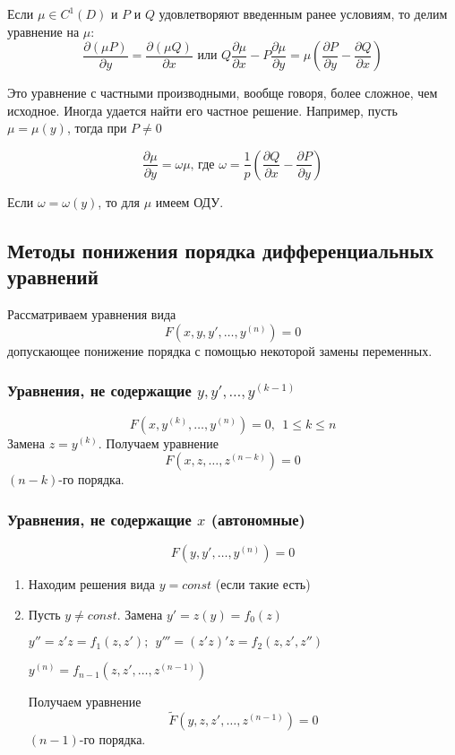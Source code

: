 \documentclass{article}
\newcommand{\pd}[2]{\frac{\partial {#1}}{\partial {#2}}}
\begin{document}
  Если $\mu \in C^1(D)$ и $P$ и $Q$ удовлетворяют введенным ранее условиям, то делим уравнение на $\mu$:
  \[ \pd{(\mu P)}{y} = \pd{(\mu Q)}{x} \text{ или } Q\pd{\mu}{x} - P\pd{\mu}{y} = \mu\left(\pd{P}{y} - \pd{Q}{x} \right) \]

  Это уравнение с частными производными, вообще говоря, более сложное, чем исходное. Иногда удается найти его частное решение. Например, пусть  $\mu = \mu(y)$, тогда при $P \neq 0$

  \[ \pd{\mu}{y} = \omega\mu \text{, где } \omega = \frac{1}{p} \left( \pd{Q}{x} - \pd{P}{y} \right)\]

  Если $\omega = \omega(y)$, то для $\mu$ имеем ОДУ.

  \subsection{Методы понижения порядка дифференциальных уравнений}
  Рассматриваем уравнения вида
  \begin{equation}
  \label{three.one}
  F(x, y, y', \ldots , y^{(n)}) = 0
  \end{equation}
  допускающее понижение порядка с помощью некоторой замены переменных.
  
  \subsubsection{Уравнения, не содержащие $y , y', \ldots, y^{(k-1)}$}
  \begin{equation}
  \label{three.two}
  F(x, y^{(k)}, \ldots, y^{(n)}) = 0,~~ 1 \leqslant k \leqslant n
  \end{equation}
  Замена $z = y^{(k)}$. Получаем уравнение
  \[ F(x, z, \ldots, z^{(n - k)}) = 0 \]
  $(n - k)$-го порядка.

  \subsubsection{Уравнения, не содержащие $x$ (автономные)}
  \begin{equation}
  \label{three.three}
  F(y, y', \ldots, y^{(n)}) = 0
  \end{equation}
  \begin{enumerate}
  \item Находим решения вида $y = const$ (если такие есть)
  \item Пусть $y \neq const$. Замена $y' = z(y) = f_0(z)$

  \noindent $y'' = z'z = f_1(z, z'); ~~ y''' = (z'z)'z = f_2(z, z', z'')$

  \noindent $y^{(n)} = f_{n - 1}(z, z', \ldots, z^{(n-1)})$

  Получаем уравнение
  $$ \tilde{F}(y, z, z', \ldots, z^{(n -1)}) = 0 $$
  $(n - 1)$-го порядка.
  \end{enumerate}
\end{document}
